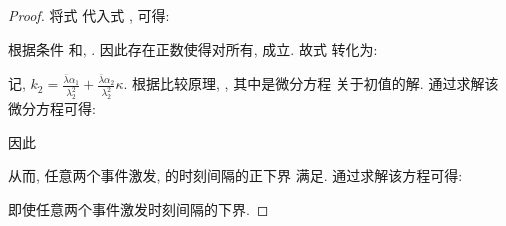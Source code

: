 \begin{proof}
\begin{comment}
        +c\bar{\gamma}(\bar{\lambda}+\rho)(\|\hat{{\delta}}(t)\|+\|\hat{x}(t)\|).
        \end{comment}
        将式  代入式 , 可得:
         \begin{comment}\label{ex1}
        \frac{d}{dt}\frac{\|\hat{{\delta}}(t)\|}{\|\hat{x}(t)\|}&\leq\Big(1+\frac{\|\hat{{\delta}}(t)\|}{\|\hat{x}(t)\|}\Big)
        \Bigg[\frac{\bar{\lambda}\alpha_1}{\lambda_2^2}+\frac{\bar{\lambda}\alpha_2}{\lambda_2^2}\frac{\|\hat{x}(t-\tau)\|}{\|\hat{x}(t)\|}
        +c\bar{\gamma}(\bar{\lambda}+\rho)\Big(1+\frac{\|\hat{{\delta}}(t)\|}{\|\hat{x}(t)\|}\Big)\Bigg].
        \end{comment}
        根据条件  和, . 因此存在正数使得对所有, 成立. 故式  转化为:
        \begin{comment}\label{ax2}
        \frac{d}{dt}\frac{\|\hat{{\delta}}(t)\|}{\|\hat{x}(t)\|}\leq c\bar{\gamma}(\bar{\lambda}+\rho)\Big(1+\frac{\|\hat{{\delta}}(t)\|}{\|\hat{x}(t)\|}\Big)^2
        +(\frac{\bar{\lambda}\alpha_1}{\lambda_2^2}
        +\frac{\bar{\lambda}\alpha_2}{\lambda_2^2}\kappa)\Big(1+\frac{\|\hat{{\delta}}(t)\|}{\|\hat{x}(t)\|}\Big).
        \end{comment}
        记, $k_2=\frac{\bar{\lambda}\alpha_1}{\lambda_2^2}
        +\frac{\bar{\lambda}\alpha_2}{\lambda_2^2}\kappa$.
        根据比较原理, , 其中是微分方程 关于初值的解. 通过求解该微分方程可得:
        \begin{comment}
        \phi(t)=\frac{k_2\exp\big\{k_2t+\ln\frac{k_1\phi_0+k_1}{k_1\phi_0+k_1+k_2}\big\}}{k_1-k_1\exp\big\{k_2t+\ln\frac{k_1\phi_0+k_1}{k_1\phi_0+k_1+k_2}\big\}}-1,
        \end{comment}
        因此
        \begin{comment}
        \frac{\|\hat{\delta}(t)\|}{\|\hat{x}(t)\|}\leq\phi(t).
        \end{comment}
        从而, 任意两个事件激发, 的时刻间隔的正下界 满足. 通过求解该方程可得:

        即使任意两个事件激发时刻间隔的下界.
        \end{proof}

